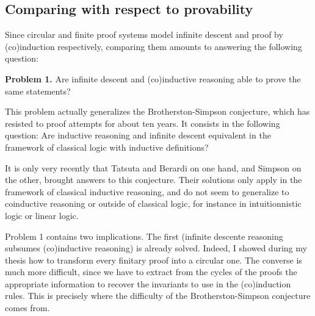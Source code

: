 \documentclass{article}
\begin{document}
\label{ComparaisonParkCirc}

\subsection{Comparing with respect to provability}

Since circular and finite proof systems model infinite descent and proof by (co)induction respectively, comparing them amounts to answering the following question:
\begin{center}
\begin{bclogo}[logo= ,arrondi = 0.1, couleur = green!10,  epBarre = 0]{}
  \vspace{-10pt}
  \textbf{Problem 1.}
Are infinite descent and (co)inductive reasoning able to prove the same statements?

\end{bclogo}
\end{center}

This problem actually generalizes the Brotherston-Simpson conjecture, which has resisted to proof attempts for about ten years. It consists in the following question: Are inductive reasoning and infinite descent equivalent in the framework of classical logic with inductive definitions?


It is only very recently that Tatsuta and Berardi \cite{BerardiT17fossacs, BerardiT17lics} on one hand, and Simpson \cite{Simpson17fossacs} on the other, brought answers to this conjecture. Their solutions only apply in the framework of classical inductive reasoning, and do not seem to generalize to coinductive reasoning or outside of classical logic, for instance in intuitionnistic logic or linear logic.


\smallskip
Problem 1 contains two implications. The first (infinite descente reasoning subsumes (co)inductive reasoning) is already solved. Indeed, I showed during my thesis how to transform every finitary proof into a circular one. The converse is much more difficult, since we have to extract from the cycles of the proofs the appropriate information to recover the invariants to use in the (co)induction rules. This is precisely where the difficulty of the Brotherston-Simpson conjecture comes from.
  
\end{document}

